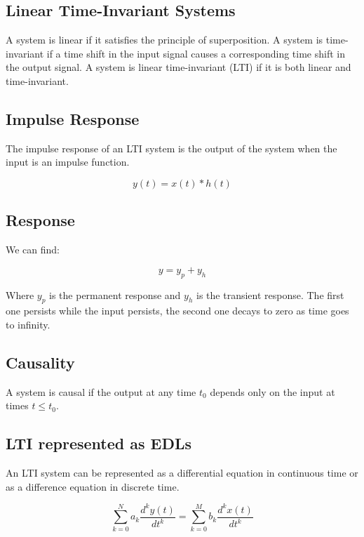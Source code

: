 \documentclass[letterpaper]{article}
\begin{document}
    \begin{multicols}{2}

        \section{Linear Time-Invariant Systems}

        A system is linear if it satisfies the principle of superposition. A system is time-invariant if a time shift in the input signal causes a corresponding time shift in the output signal. A system is linear time-invariant (LTI) if it is both linear and time-invariant.

        \subsection{Impulse Response}

        The impulse response of an LTI system is the output of the system when the input is an impulse function.

        \[y(t) = x(t) * h(t)\]

        \subsection{Response}

        We can find:

        \[y = y_p + y_h\]

        Where $y_p$ is the permanent response and $y_h$ is the transient response. The first one persists while the input persists, the second one decays to zero as time goes to infinity.

        \subsection{Causality}

        A system is causal if the output at any time $t_0$ depends only on the input at times $t \leq t_0$.

        \subsection{LTI represented as EDLs}

        An LTI system can be represented as a differential equation in continuous time or as a difference equation in discrete time.

        \[\sum_{k=0}^{N} a_k \frac{d^k y(t)}{dt^k} = \sum_{k=0}^{M} b_k \frac{d^k x(t)}{dt^k}\]


\end{multicols}
\end{document}

